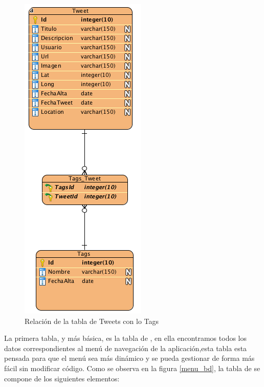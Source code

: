 \begin{figure}
\begin{center}
\includegraphics[scale=0.7]{imagenes/map.png}
\caption{Relación de la tabla de Tweets con lo Tags}
\label{map_bd}
\end{center}
\end{figure}


\vspace{5 mm}

La primera tabla, y más básica, es la tabla de , en ella encontramos todos los datos correspondientes al menú de navegación de la
aplicación,esta tabla esta pensada para que el menú sea más dinámico y se pueda gestionar de forma más fácil sin modificar código. Como se observa en la
figura \ref{menu_bd}, la tabla de  se compone de los siguientes elementos:

